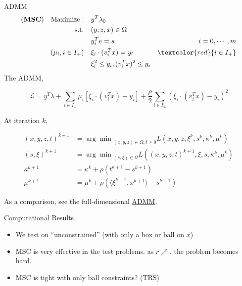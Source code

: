 \documentclass[aspectratio=1610, 9pt]{beamer}
\newcommand{\model}[1]{(\textbf{#1})}
\newcommand{\red}[1]{\textcolor{red}{#1}}
\begin{document}
\begin{frame}{ADMM}
  \begin{align}
    \model{MSC} \quad \mathrm{Maximize: }\quad & y ^T\lambda_0                                         \\
    \mathrm{s.t.} \quad                        & (y,z,x) \in \Omega                                    \\
                                               & y_i^Te = s                           & i=0, \cdots, m \\
    ( \mu_i, i\in I_+ )    \quad               & \xi_i \cdot (v_i^Tx) = y_i           & \red{i\in I_+} \\
                                               & \xi_i^2 \le y_i,  (v_i^Tx)^2 \le y_i
  \end{align}
  The ADMM,

  \begin{equation}
    \mathcal L = y^T\lambda + \sum_{i \in I_+} \mu_i \left [\xi_i \cdot(v_i^Tx) - y_i\right] + \frac{\rho}{2}\sum_{i \in I_+} (\xi_i \cdot (v_i^Tx) - y_i)^2
  \end{equation}

  At iteration \(k\),

  \begin{align*}
    (x,y,z,t)^{k+1} & = {\arg\min}_{(x,y,z)\in\Omega, t\ge 0} L\left(x,y,z,\xi^k,s^k,\kappa^k,\mu^k\right)       \\
    (s, \xi)^{k+1}  & = {\arg\min}_{(s, \xi)\in\mathscr{Q}} L\left((x,y,z,t)^{k+1},\xi,s, \kappa^k, \mu^k\right) \\
    \kappa^{k+1}    & = \kappa^k + \rho\left(t^{k+1}-s^{k+1}\right)                                              \\
    \mu^{k+1}       & = \mu^k + \rho\left( \langle\xi^{k+1}, x^{k+1}\rangle - s^{k+1}\right)
  \end{align*}

  As a comparison, see the full-dimensional \hyperlink{oldad}{ADMM}.
\end{frame}
\begin{frame}[allowframebreaks]{Computational Results}
  \begin{itemize}
    \item We test on ``unconstrained'' (with only a box or ball on \(x\))
    \item MSC is very effective in the test problems. as \(r \nearrow \), the problem becomes hard.
    \item MSC is tight with only ball constraints? (TRS)
  \end{itemize}
\end{frame}
\end{document}
